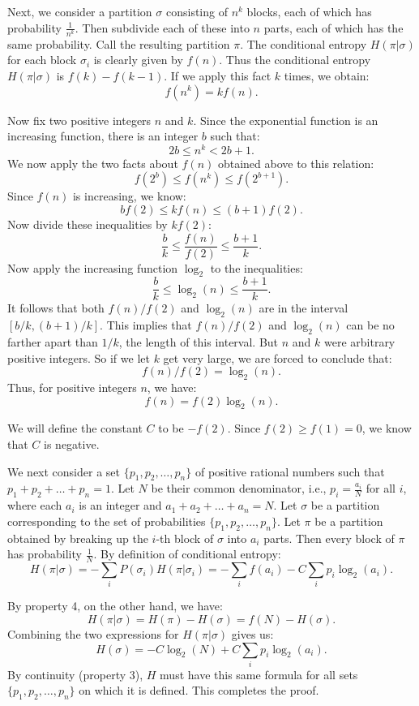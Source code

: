 \documentclass{report}
\begin{document}
Next, we consider a partition \( \sigma \) consisting of \( n^k \) blocks, each of which has probability \( \frac{1}{n^k} \). Then subdivide each of these into \( n \) parts, each of which has the same probability. Call the resulting partition \( \pi \). The conditional entropy \( H(\pi|\sigma) \) for each block \( \sigma_i \) is clearly given by \( f(n) \). Thus the conditional entropy \( H(\pi|\sigma) \) is \( f(k) - f(k-1) \). If we apply this fact \( k \) times, we obtain:
\[
f(n^k) = k f(n).
\]

Now fix two positive integers \( n \) and \( k \). Since the exponential function is an increasing function, there is an integer \( b \) such that:
\[
2b \leq n^k < 2b+1.
\]
We now apply the two facts about \( f(n) \) obtained above to this relation:
\[
f(2^b) \leq f(n^k) \leq f(2^{b+1}).
\]
Since \( f(n) \) is increasing, we know:
\[
b f(2) \leq k f(n) \leq (b+1)f(2).
\]
Now divide these inequalities by \( k f(2) \):
\[
\frac{b}{k} \leq \frac{f(n)}{f(2)} \leq \frac{b+1}{k}.
\]
Now apply the increasing function \( \log_2 \) to the inequalities:
\[
\frac{b}{k} \leq \log_2(n) \leq \frac{b+1}{k}.
\]
It follows that both \( f(n)/f(2) \) and \( \log_2(n) \) are in the interval \( [b/k, (b+1)/k] \). This implies that \( f(n)/f(2) \) and \( \log_2(n) \) can be no farther apart than \( 1/k \), the length of this interval. But \( n \) and \( k \) were arbitrary positive integers. So if we let \( k \) get very large, we are forced to conclude that:
\[
f(n)/f(2) = \log_2(n).
\]
Thus, for positive integers \( n \), we have:
\[
f(n) = f(2) \log_2(n).
\]

We will define the constant \( C \) to be \( -f(2) \). Since \( f(2) \geq f(1) = 0 \), we know that \( C \) is negative.

We next consider a set \( \{p_1, p_2, \ldots, p_n\} \) of positive rational numbers such that \( p_1 + p_2 + \ldots + p_n = 1 \). Let \( N \) be their common denominator, i.e., \( p_i = \frac{a_i}{N} \) for all \( i \), where each \( a_i \) is an integer and \( a_1 + a_2 + \ldots + a_n = N \). Let \( \sigma \) be a partition corresponding to the set of probabilities \( \{p_1, p_2, \ldots, p_n\} \). Let \( \pi \) be a partition obtained by breaking up the \( i \)-th block of \( \sigma \) into \( a_i \) parts. Then every block of \( \pi \) has probability \( \frac{1}{N} \). By definition of conditional entropy:
\[
H(\pi|\sigma) = -\sum_{i} P(\sigma_i) H(\pi|\sigma_i) = -\sum_{i} f(a_i) - C \sum_{i} p_i \log_2(a_i).
\]

By property 4, on the other hand, we have:
\[
H(\pi|\sigma) = H(\pi) - H(\sigma) = f(N) - H(\sigma).
\]
Combining the two expressions for \( H(\pi|\sigma) \) gives us:
\[
H(\sigma) = -C \log_2(N) + C \sum_{i} p_i \log_2(a_i).
\]
By continuity (property 3), \( H \) must have this same formula for all sets \( \{p_1, p_2, \ldots, p_n\} \) on which it is defined. This completes the proof.
\end{document}
